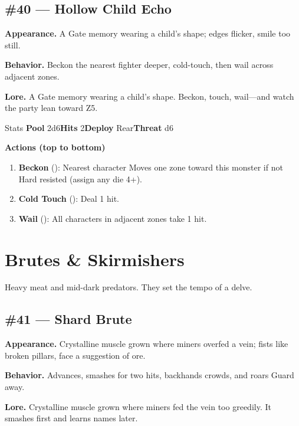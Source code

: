 \subsection*{\#40 --- Hollow Child Echo}

\textbf{Appearance.} A Gate memory wearing a child's shape; edges flicker, smile too still.

\textbf{Behavior.} Beckon the nearest fighter deeper, cold-touch, then wail across adjacent zones.

\textbf{Lore.} A Gate memory wearing a child's shape. Beckon, touch, wail---and watch the party lean toward Z5.

\begin{monsterentry}{Stats}
\textbf{Pool} 2d6\quad\textbf{Hits} 2\quad\textbf{Deploy} Rear\quad\textbf{Threat} d6

\textbf{Actions (top to bottom)}
\begin{enumerate}\setlength{\itemsep}{0.15em}\setlength{\parskip}{0pt}
  \item \textbf{Beckon} (\easy): Nearest character Moves one zone toward this monster if not Hard resisted (assign any die 4+).
  \item \textbf{Cold Touch} (\medium): Deal 1 hit.
  \item \textbf{Wail} (\hard): All characters in adjacent zones take 1 hit.
\end{enumerate}
\end{monsterentry}

\section{Brutes \& Skirmishers}

Heavy meat and mid-dark predators. They set the tempo of a delve.

\subsection*{\#41 --- Shard Brute}

\textbf{Appearance.} Crystalline muscle grown where miners overfed a vein; fists like broken pillars, face a suggestion of ore.

\textbf{Behavior.} Advances, smashes for two hits, backhands crowds, and roars Guard away.

\textbf{Lore.} Crystalline muscle grown where miners fed the vein too greedily. It smashes first and learns names later.


